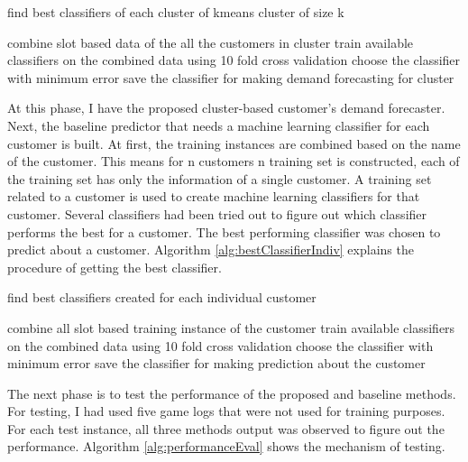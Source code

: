 \begin{algorithm} [!h]
\caption{find best classifiers of each cluster of kmeans cluster of size k}
\begin{algorithmic} [1]
    \STATE combine slot based data of the all the customers in cluster
    \STATE train available classifiers on the combined data using 10 fold cross validation
    \STATE choose the classifier with minimum error
    \STATE save the classifier for making demand forecasting for cluster
\ENDFOR 
\end{algorithmic}
\label{alg:bestClassifierForCluster}
\end{algorithm}


At this phase, I have the proposed cluster-based customer's demand forecaster. Next, the baseline predictor that needs a machine learning classifier for each customer is built. At first, the training instances are combined based on the name of the customer. This means for n customers n training set is constructed, each of the training set has only the information of a single customer. A training set related to a customer is used to create machine learning classifiers for that customer. Several classifiers had been tried out to figure out which classifier performs the best for a customer. The best performing classifier was chosen to predict about a customer. Algorithm \ref{alg:bestClassifierIndiv} explains the procedure of getting the best classifier.

\begin{algorithm}[!h]
\caption{find best classifiers created for each individual customer}
\begin{algorithmic} [1]
    \STATE combine all slot based training instance of the customer
    \STATE train available classifiers on the combined data using 10 fold cross validation
    \STATE choose the classifier with minimum error
    \STATE save the classifier for making prediction about the customer
\ENDFOR 
\end{algorithmic}
\label{alg:bestClassifierIndiv}
\end{algorithm}

The next phase is to test the performance of the proposed and baseline methods. For testing, I had used five game logs that were not used for training purposes. For each test instance, all three methods output was observed to figure out the performance. Algorithm \ref{alg:performanceEval} shows the mechanism of testing.

